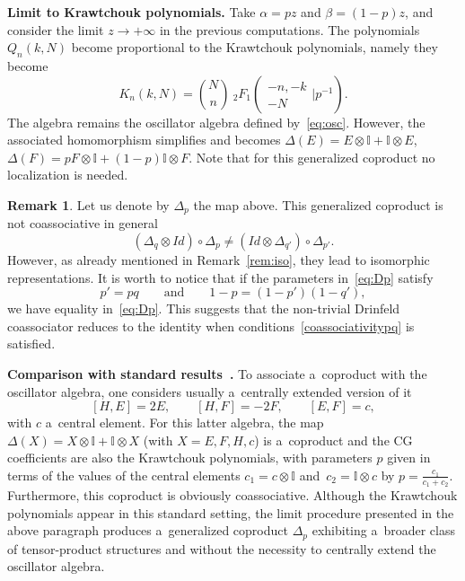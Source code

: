 \documentclass[10pt,a4paper]{amsart}
\numberwithin{equation}{section}
\theoremstyle{definition}
\newtheorem{Remark}[Theorem]{Remark}
\begin{document}
{\bf Limit to Krawtchouk polynomials.} Take $\alpha=p z$ and $\beta=(1-p)z$, and consider the limit $z\to+\infty$ in the previous computations. The polynomials $Q_n(k,N)$ become proportional to the Krawtchouk polynomials, namely they become
\[K_n(k,N)=\binom{N}{n}\ {}_2F_1\left(\begin{array}{c} -n, -k \\ -N\end{array}\Bigg\vert p^{-1}\right) .\]
The algebra remains the oscillator algebra defined by~\eqref{eq:osc}. However, the associated homomorphism simplifies and becomes
$
\Delta(E)=E\otimes \mathbb{I}+\mathbb{I} \otimes E$, $
\Delta(F)=pF\otimes \mathbb{I}+(1-p)\mathbb{I}\otimes F$.
Note that for this generalized coproduct no localization is needed.
\begin{Remark}\label{rema_coassociativitypq}
Let us denote by $\Delta_p$ the map above.
This generalized coproduct is not coassociative in general
\begin{equation}\label{eq:Dp}
 (\Delta_q\otimes Id)\circ\Delta_p \neq (Id\otimes \Delta_{q'})\circ\Delta_{p'}.
\end{equation}
However, as already mentioned in Remark~\ref{rem:iso}, they lead to isomorphic representations.
It is worth to notice that if the parameters in~\eqref{eq:Dp} satisfy
\begin{equation}\label{coassociativitypq}
p'=pq \qquad \text{and}\qquad 1-p=(1-p')(1-q'),\end{equation}
we have equality in~\eqref{eq:Dp}.
This suggests that the non-trivial Drinfeld coassociator reduces to the identity when conditions~\eqref{coassociativitypq} is satisfied.
\end{Remark}

{\bf Comparison with standard results~\cite{CVV,Zhosc}.} To associate a~coproduct with the oscillator algebra, one considers usually a~centrally extended version of it
\begin{equation}\label{eq:oscext}
[H,E]=2E,\qquad [H,F]=-2F,\qquad [E,F]=c,
\end{equation}
with $c$ a~central element.
For this latter algebra, the map $\Delta(X)=X\otimes \mathbb{I} + \mathbb{I} \otimes X$ (with $X=E,F,H,c$) is a~coproduct and the CG coefficients are also the Krawtchouk polynomials, with parameters $p$ given in terms of the values of the central elements $c_1=c\otimes \mathbb{I}$ and~${c_2=\mathbb{I} \otimes c}$ by
$ p=\frac{c_1}{c_1+c_2}$.
Furthermore, this coproduct is obviously coassociative.
Although the Krawtchouk polynomials appear in this
standard setting, the limit procedure presented in the above paragraph produces a~generalized coproduct $\Delta_p$ exhibiting a~broader class of tensor-product structures and without the necessity to centrally extend the oscillator algebra.
\end{document}
